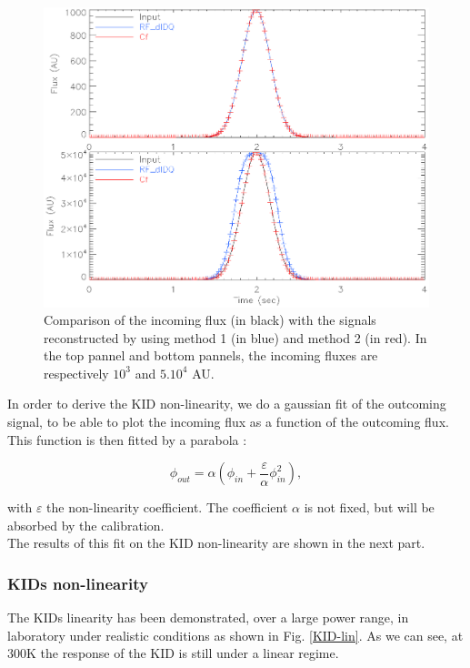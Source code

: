 \begin{figure}[h]
\includegraphics[scale=0.6]{Figures/planets.eps}
\caption{Comparison of the incoming flux (in black) with the signals reconstructed by using method 1 (in blue) and method 2 (in red). In the top pannel and bottom pannels, the incoming fluxes are respectively $10^{3}$ and $5.10^{4}$ AU.}
\label{planet}
\end{figure}

In order to derive the KID non-linearity, we do a gaussian fit of the outcoming signal, to be able to plot the incoming flux as a function of the outcoming flux. This function is then fitted by a parabola :

\begin{equation}
\phi_{out} = \alpha (\phi_{in} + \frac{\varepsilon}{\alpha}  \phi_{in}^{2}) ,
\label{fit_NL}
\end{equation}

with $\varepsilon$ the non-linearity coefficient. The coefficient $\alpha$ is not fixed, but will be absorbed by the calibration.\\
The results of this fit on the KID non-linearity are shown in the next part.

\subsubsection{KIDs non-linearity}

The KIDs linearity has been demonstrated, over a large power range, in laboratory under realistic conditions as shown in Fig. \ref{KID-lin}. As we can see, at 300K the response of the KID is still under a linear regime.

